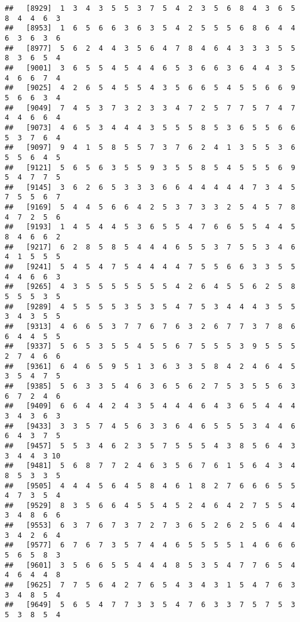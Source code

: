\documentclass[
]{book}
\begin{document}
\begin{verbatim}
##   [8929]  1  3  4  3  5  5  3  7  5  4  2  3  5  6  8  4  3  6  5  8  4  4  6  3
##   [8953]  1  6  5  6  6  3  6  3  5  4  2  5  5  5  6  8  6  4  4  6  3  6  3  6
##   [8977]  5  6  2  4  4  3  5  6  4  7  8  4  6  4  3  3  3  5  5  8  3  6  5  4
##   [9001]  3  6  5  5  4  5  4  4  6  5  3  6  6  3  6  4  4  3  5  4  6  6  7  4
##   [9025]  4  2  6  5  4  5  5  4  3  5  6  6  5  4  5  5  6  6  9  5  6  6  3  4
##   [9049]  7  4  5  3  7  3  2  3  3  4  7  2  5  7  7  5  7  4  7  4  4  6  6  4
##   [9073]  4  6  5  3  4  4  4  3  5  5  5  8  5  3  6  5  5  6  6  5  3  7  6  4
##   [9097]  9  4  1  5  8  5  5  7  3  7  6  2  4  1  3  5  5  3  6  5  5  6  4  5
##   [9121]  5  6  5  6  3  5  5  9  3  5  5  8  5  4  5  5  5  6  9  5  4  7  7  5
##   [9145]  3  6  2  6  5  3  3  3  6  6  4  4  4  4  4  7  3  4  5  7  5  5  6  7
##   [9169]  5  4  4  5  6  6  4  2  5  3  7  3  3  2  5  4  5  7  8  4  7  2  5  6
##   [9193]  1  4  5  4  4  5  3  6  5  5  4  7  6  6  5  5  4  4  5  8  4  6  6  2
##   [9217]  6  2  8  5  8  5  4  4  4  6  5  5  3  7  5  5  3  4  6  4  1  5  5  5
##   [9241]  5  4  5  4  7  5  4  4  4  4  7  5  5  6  6  3  3  5  5  4  4  6  6  3
##   [9265]  4  3  5  5  5  5  5  5  5  4  2  6  4  5  5  6  2  5  8  5  5  5  3  5
##   [9289]  4  5  5  5  5  3  5  3  5  4  7  5  3  4  4  4  3  5  5  3  4  3  5  5
##   [9313]  4  6  6  5  3  7  7  6  7  6  3  2  6  7  7  3  7  8  6  6  4  4  5  5
##   [9337]  5  6  5  3  5  5  4  5  5  6  7  5  5  5  3  9  5  5  5  2  7  4  6  6
##   [9361]  6  4  6  5  9  5  1  3  6  3  3  5  8  4  2  4  6  4  5  3  5  4  7  5
##   [9385]  5  6  3  3  5  4  6  3  6  5  6  2  7  5  3  5  5  6  3  6  7  2  4  6
##   [9409]  6  6  4  4  2  4  3  5  4  4  4  6  4  3  6  5  4  4  4  3  4  3  6  3
##   [9433]  3  3  5  7  4  5  6  3  3  6  4  6  5  5  5  3  4  4  6  6  4  3  7  5
##   [9457]  5  5  3  4  6  2  3  5  7  5  5  5  4  3  8  5  6  4  3  3  4  4  3 10
##   [9481]  5  6  8  7  7  2  4  6  3  5  6  7  6  1  5  6  4  3  4  8  5  3  3  5
##   [9505]  4  4  4  5  6  4  5  8  4  6  1  8  2  7  6  6  6  5  5  4  7  3  5  4
##   [9529]  8  3  5  6  6  4  5  5  4  5  2  4  6  4  2  7  5  5  4  3  4  8  6  6
##   [9553]  6  3  7  6  7  3  7  2  7  3  6  5  2  6  2  5  6  4  4  3  4  2  6  4
##   [9577]  6  7  6  7  3  5  7  4  4  6  5  5  5  5  1  4  6  6  6  5  6  5  8  3
##   [9601]  3  5  6  6  5  5  4  4  4  8  5  3  5  4  7  7  6  5  4  4  6  4  4  8
##   [9625]  7  7  5  6  4  2  7  6  5  4  3  4  3  1  5  4  7  6  3  3  4  8  5  4
##   [9649]  5  6  5  4  7  7  3  3  5  4  7  6  3  3  7  5  7  5  3  5  3  8  5  4

\end{verbatim}
\end{document}
